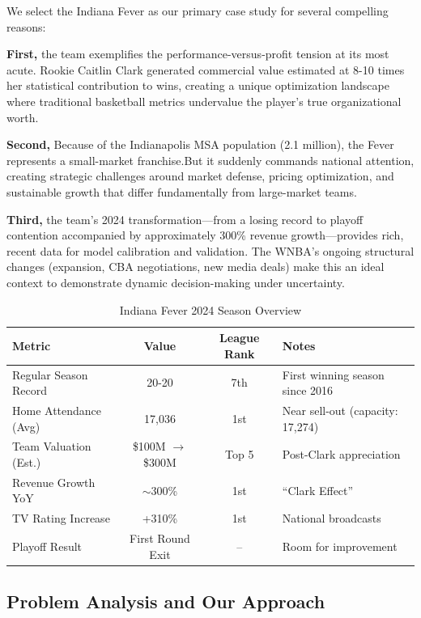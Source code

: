 \documentclass{mcmthesis}
\begin{document}
We select the Indiana Fever as our primary case study for several compelling reasons:

\textbf{First,} the team exemplifies the performance-versus-profit tension at its most acute. Rookie Caitlin Clark generated commercial value estimated at 8-10 times her statistical contribution to wins, creating a unique optimization landscape where traditional basketball metrics undervalue the player's true organizational worth.

\textbf{Second,} Because of the Indianapolis MSA population (2.1 million), the Fever represents a small-market franchise.But it suddenly commands national attention, creating strategic challenges around market defense, pricing optimization, and sustainable growth that differ fundamentally from large-market teams.

\textbf{Third,} the team's 2024 transformation---from a losing record to playoff contention accompanied by approximately 300\% revenue growth---provides rich, recent data for model calibration and validation. The WNBA's ongoing structural changes (expansion, CBA negotiations, new media deals) make this an ideal context to demonstrate dynamic decision-making under uncertainty.

\begin{table}[H]
\centering
\caption{Indiana Fever 2024 Season Overview}
\begin{tabular}{lccl}
\toprule
\textbf{Metric} & \textbf{Value} & \textbf{League Rank} & \textbf{Notes} \\
\midrule
Regular Season Record & 20-20 & 7th & First winning season since 2016 \\
Home Attendance (Avg) & 17,036 & 1st & Near sell-out (capacity: 17,274) \\
Team Valuation (Est.) & \$100M $\rightarrow$ \$300M & Top 5 & Post-Clark appreciation \\
Revenue Growth YoY & $\sim$300\% & 1st & ``Clark Effect'' \\
TV Rating Increase & +310\% & 1st & National broadcasts \\
Playoff Result & First Round Exit & -- & Room for improvement \\
\bottomrule
\end{tabular}
\end{table}

\subsection{Problem Analysis and Our Approach} 
\end{document}
